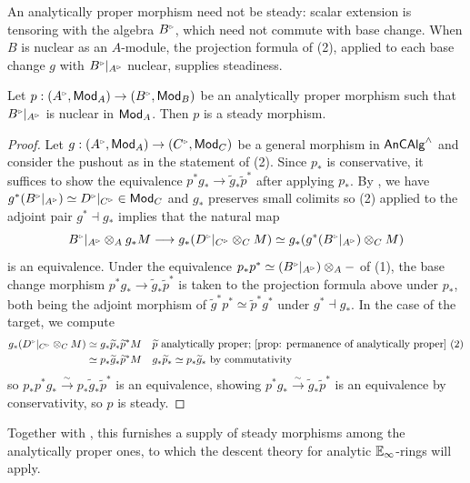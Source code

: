 An analytically proper morphism need not be steady: scalar extension is tensoring with the algebra $B^{\tri}$, which need not commute with base change. When $B$ is nuclear as an $A$-module, the projection formula of  (2), applied to each base change $g$ with $B^{\tri}|_{A^{\tri}}$ nuclear, supplies steadiness.
\begin{proposition}\label{prop: nuclear implies steady}
    Let $p:(A^{\tri},\Mod_{A})\to(B^{\tri},\Mod_{B})$ be an analytically proper morphism such that $B^{\tri}|_{A^{\tri}}$ is nuclear in $\mathsf{Mod}_{A}$. Then $p$ is a steady morphism. 
\end{proposition}
\begin{proof}
    Let $g:(A^{\tri},\Mod_{A})\to(C^{\tri},\Mod_{C})$ be a general morphism in $\mathsf{An}\mathsf{CAlg}^{\wedge}$ and consider the pushout as in the statement of  (2). Since $p_{*}$ is conservative, it suffices to show the equivalence $p^{*}g_{*}\to\widetilde{g}_{*}\widetilde{p}^{*}$ after applying $p_{*}$. By , we have $g^{*}(B^{\tri}|_{A^{\tri}})\simeq D^{\tri}|_{C^{\tri}}\in\Mod_{C}$ and $g_{*}$ preserves small colimits so  (2) applied to the adjoint pair $g^{*}\dashv g_{*}$ implies that the natural map
    $$B^{\tri}|_{A^{\tri}}\otimes_{A}g_{*}M\longrightarrow g_{*}(D^{\tri}|_{C^{\tri}}\otimes_{C}M)\simeq g_{*}(g^{*}(B^{\tri}|_{A^{\tri}})\otimes_{C}M)$$
    is an equivalence. Under the equivalence $p_{*}p^{*}\simeq(B^{\tri}|_{A^{\tri}})\otimes_{A}-$ of  (1), the base change morphism $p^{*}g_{*}\to\widetilde{g}_{*}\widetilde{p}^{*}$ is taken to the projection formula above under $p_{*}$, both being the adjoint morphism of $\widetilde{g}^{*}p^{*}\simeq \widetilde{p}^{*}g^{*}$ under $g^{*}\dashv g_{*}$. In the case of the target, we compute 
    \begin{align*}
        g_{*}(D^{\tri}|_{C^{\tri}}\otimes_{C}M) &\simeq g_{*}\widetilde{p}_{*}\widetilde{p}^{*}M && \widetilde{p}\text{ analytically proper; \Cref{prop: permanence of analytically proper} (2)} \\
        &\simeq p_{*}\widetilde{g}_{*}\widetilde{p}^{*}M && g_{*}\widetilde{p}_{*}\simeq p_{*}\widetilde{g}_{*} \text{ by commutativity}
    \end{align*}
    so $p_{*}p^{*}g_{*}\xrightarrow{\sim}p_{*}\widetilde{g}_{*}\widetilde{p}^{*}$ is an equivalence, showing $p^{*}g_{*}\xrightarrow{\sim}\widetilde{g}_{*}\widetilde{p}^{*}$ is an equivalence by conservativity, so $p$ is steady. 
\end{proof}
Together with , this furnishes a supply of steady morphisms among the analytically proper ones, to which the descent theory for analytic $\mathbb{E}_{\infty}$-rings will apply. 

